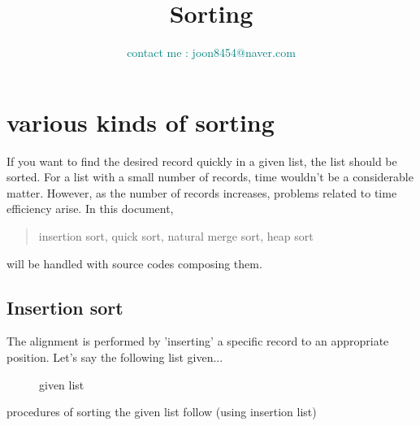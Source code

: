 \documentclass{article}
\begin{document}
\title{Sorting}
\author{\textcolor{teal}{contact me : joon8454@naver.com}}
\maketitle
\lstset{style=mystyle}

\section{various kinds of sorting}
If you want to find the desired record quickly in a given list, the list should be sorted. For a list with a small number of records, time wouldn't be a considerable matter. However, as the number of records increases, problems related to time efficiency arise. In this document,
\begin{quote}
    \centering insertion sort, quick sort, natural merge sort, heap sort
\end{quote} will be handled with source codes composing them.

\subsection{Insertion sort}
The alignment is performed by 'inserting' a specific record to an appropriate position.
Let's say the following list given...\\
\begin{figure}[H]\centering
{}
\caption{given list}
\end{figure}
procedures of sorting the given list follow (using insertion list)\\


\begin{center}
\end{center}



\begin{center}
\end{center}
\end{document}
